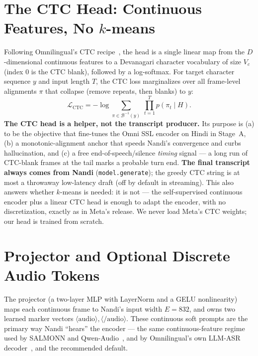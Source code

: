 \documentclass[11pt]{article}
\newcommand{\code}[1]{\texttt{#1}}
\begin{document}
\section{The CTC Head: Continuous Features, No $k$-means}
\label{sec:ctc}
Following Omnilingual's CTC recipe~\cite{omni}, the head is a single linear map from the
$D$-dimensional continuous features to a Devanagari character vocabulary of size $V_c$
(index $0$ is the CTC blank), followed by a log-softmax. For target character sequence $y$
and input length $T$, the CTC loss marginalizes over all frame-level alignments $\pi$ that
collapse (remove repeats, then blanks) to $y$:
\begin{equation}
\mathcal{L}_{\text{CTC}}=-\log\!\!\sum_{\pi\in\mathcal{B}^{-1}(y)}\ \prod_{t=1}^{T} p(\pi_t\mid H).
\end{equation}
\textbf{The CTC head is a helper, not the transcript producer.} Its purpose is (a) to be the
objective that fine-tunes the Omni SSL encoder on Hindi in Stage~A, (b) a monotonic-alignment
anchor that speeds Nandi's convergence and curbs hallucination, and (c) a free
end-of-speech/silence \emph{timing} signal --- a long run of CTC-blank frames at the tail
marks a probable turn end. \textbf{The final transcript always comes from Nandi}
(\code{model.generate}); the greedy CTC string is at most a throwaway low-latency draft
(off by default in streaming). This also answers whether $k$-means is needed: it is not ---
the self-supervised continuous encoder plus a linear CTC head is enough to adapt the encoder,
with no discretization, exactly as in Meta's release. We never load Meta's CTC weights; our
head is trained from scratch.

\section{Projector and Optional Discrete Audio Tokens}
The projector (a two-layer MLP with LayerNorm and a GELU nonlinearity) maps each continuous
frame to Nandi's input width $E{=}832$, and owns two learned marker vectors
$\langle\text{audio}\rangle,\langle/\text{audio}\rangle$. These continuous soft prompts are
the primary way Nandi ``hears'' the encoder --- the same continuous-feature regime used by
SALMONN and Qwen-Audio~\cite{salmonn,qwenaudio}, and by Omnilingual's own LLM-ASR
decoder~\cite{omni}, and the recommended default.
\end{document}
